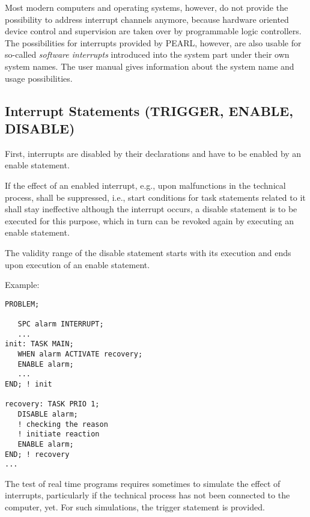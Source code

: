 Most modern computers and operating systems, however, do not provide the
possibility to address interrupt channels anymore, because hardware
oriented device control and supervision are taken over by programmable
logic controllers. The possibilities for interrupts provided by PEARL,
however, are also usable for so-called {\em software interrupts}
introduced into the system part under their own system names. The user manual
gives information about the system name and usage possibilities.

\subsection{Interrupt Statements (TRIGGER, ENABLE, DISABLE)}    %
\label{sec_task_interrupt}

First, interrupts are disabled by their declarations and have to be
enabled by an enable statement.

If the effect of an enabled interrupt, e.g., upon malfunctions in the
technical process, shall be suppressed, i.e., start conditions for task
statements related to it shall stay ineffective although the interrupt
occurs, a disable statement is to be executed for this purpose, which
in turn can be revoked again by executing an enable statement.

\begin{grammarframe}
\end{grammarframe}

The validity range of the disable statement starts with its
execution and ends upon execution of an enable statement.

Example:

\begin{lstlisting}
PROBLEM;

   SPC alarm INTERRUPT;
   ...
init: TASK MAIN;
   WHEN alarm ACTIVATE recovery;
   ENABLE alarm;
   ... 
END; ! init

recovery: TASK PRIO 1;
   DISABLE alarm;
   ! checking the reason
   ! initiate reaction
   ENABLE alarm;
END; ! recovery
...
\end{lstlisting}

The test of real time programs requires sometimes to simulate the effect
of interrupts, particularly if the technical process has not been
connected to the computer, yet. For such simulations, the trigger
statement is provided.

